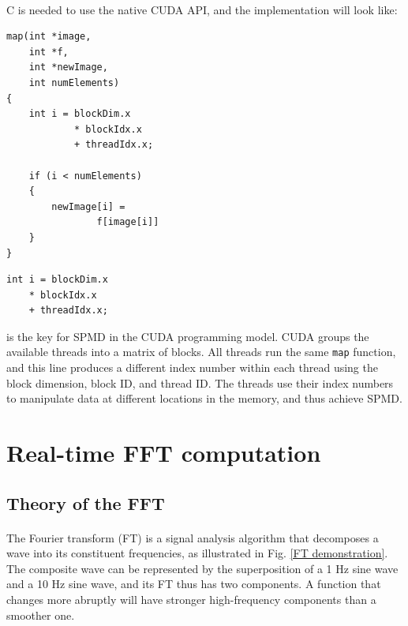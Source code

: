 \documentclass[12pt, twocolumn]{report}
\begin{document}
\paragraph{}
C is needed to use the native CUDA API, and the implementation will look like:
\begin{lstlisting}
map(int *image, 
    int *f,
    int *newImage, 
    int numElements) 
{
    int i = blockDim.x
            * blockIdx.x 
            + threadIdx.x;

    if (i < numElements) 
    {
        newImage[i] = 
                f[image[i]]
    }
}
\end{lstlisting}
\begin{lstlisting}
int i = blockDim.x
    * blockIdx.x 
    + threadIdx.x;
\end{lstlisting}
is the key for SPMD in the CUDA programming model. CUDA groups the available threads into a matrix of blocks. All threads run the same \lstinline{map} function, and this line produces a different index number within each thread using the block dimension, block ID, and thread ID. The threads use their index numbers to manipulate data at different locations in the memory, and thus achieve SPMD.

\section{Real-time FFT computation}
\subsection{Theory of the FFT}
\paragraph{}
The Fourier transform (FT) is a signal analysis algorithm that decomposes a wave into its constituent frequencies, as illustrated in Fig. \ref{FT demonstration}. The composite wave can be represented by the superposition of a 1 Hz sine wave and a 10 Hz sine wave, and its FT thus has two components. A function that changes more abruptly will have stronger high-frequency components than a smoother one.
\end{document}
